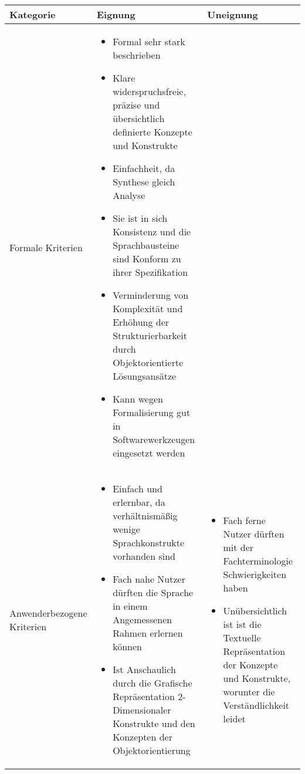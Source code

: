 \begin{tabularx}{\textwidth}{|l|X|X|}
	\hline
	Kategorie & Eignung & Uneignung  \\
	\hline
	Formale Kriterien	&
	\begin{itemize}
		\item Formal sehr stark beschrieben
		\item Klare widerspruchsfreie, präzise und übersichtlich definierte Konzepte und Konstrukte
		\item Einfachheit, da Synthese gleich Analyse
		\item Sie ist in sich Konsistenz und die Sprachbausteine sind Konform zu ihrer Spezifikation
		\item Verminderung von Komplexität und Erhöhung der Strukturierbarkeit durch Objektorientierte Lösungsansätze
		\item Kann wegen Formalisierung gut in Softwarewerkzeugen eingesetzt werden
	\end{itemize} & \\
	\hline
	Anwenderbezogene Kriterien &
	\begin{itemize}
		\item Einfach und erlernbar, da verhältnismäßig wenige Sprachkonstrukte vorhanden sind
		\item Fach nahe Nutzer dürften die Sprache in einem Angemessenen Rahmen erlernen können
		\item Ist Anschaulich durch die Grafische Repräsentation 2-Dimensionaler Konstrukte und den Konzepten der Objektorientierung
		\end{itemize}  & 
	\begin{itemize}
		\item Fach ferne Nutzer dürften mit der Fachterminologie Schwierigkeiten haben
		\item Unübersichtlich ist ist die Textuelle Repräsentation der Konzepte und Konstrukte, worunter die Verständlichkeit leidet
	\end{itemize} \\
	\hline
\end{tabularx} 
